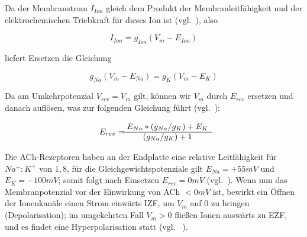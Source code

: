 Da der Membranstrom $I_{Ion}$ gleich dem Produkt der Membranleitfähigkeit und der elektrochemischen Triebkraft für dieses Ion ist (vgl.~\cite[93]{BCP18}), also

\begin{equation}
    I_{Ion} = g_{Ion}  (V_m - E_{Ion})
\end{equation}

liefert Ersetzen die Gleichung

\begin{equation}
    g_{Na}  (V_m - E_{Na}) = g_{K}  (V_m - E_{K})
\end{equation}

Da am Umkehrpotenzial $V_{rev} = V_m$ gilt, können wir $V_m$ durch $E_{rev}$ ersetzen und danach auflösen, was zur folgenden Gleichung führt (vgl.~\cite[196, Box 9-1]{KSJ+13}):

\begin{equation}
    E_{rev} = \begin{matrix}
                  E_{Na} \space * \space (g_{Na} \space / \space g_{K}) \space + \space E_{K}  \\ \hline
                  (g_{Na} \space / \space g_{K}) \space + 1
    \end{matrix}
\end{equation}

Die ACh-Rezeptoren haben an der Endplatte eine relative Leitfähigkeit für $Na^+:K^+$ von $1,8$, für die Gleichgewichtspotenziale gilt $E_{Na} = +55 mV$ und $E_{K} = -100 mV$; somit folgt nach Einsetzen $E_{rev} = 0mV$ (vgl.~\cite[100]{HS19a}).
Wenn nun das Membranpotenzial vor der Einwirkung von ACh $< 0mV$ ist, bewirkt ein Öffnen der Ionenkanäle einen Strom einwärts IZF, um $V_m$ auf $0$ zu bringen (Depolarisation); im umgekehrten Fall $V_m > 0$ fließen Ionen auswärts zu EZF, und es findet eine Hyperpolarisation statt (vgl. ~\cite[136, Exkurs 5.4]{BCP18}).\\


